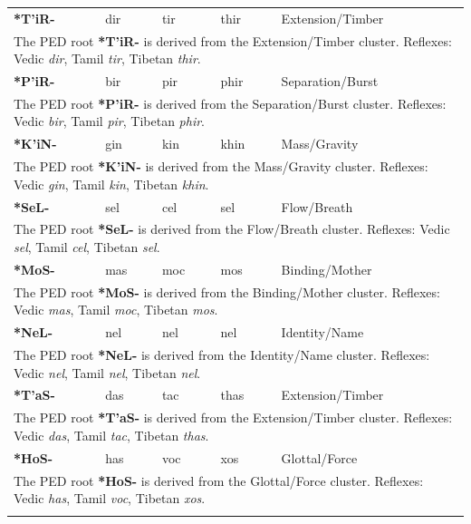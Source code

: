 \begin{longtable}{p{} p{} p{} p{} p{}}
\textbf{*T'iR-} & dir & tir & thir & Extension/Timber \\ 
\multicolumn{5}{p{\textwidth}}{\small The PED root \textbf{*T'iR-} is derived from the Extension/Timber cluster. Reflexes: Vedic \textit{dir}, Tamil \textit{tir}, Tibetan \textit{thir}. } \\ \addlinespace 
\textbf{*P'iR-} & bir & pir & phir & Separation/Burst \\ 
\multicolumn{5}{p{\textwidth}}{\small The PED root \textbf{*P'iR-} is derived from the Separation/Burst cluster. Reflexes: Vedic \textit{bir}, Tamil \textit{pir}, Tibetan \textit{phir}. } \\ \addlinespace 
\textbf{*K'iN-} & gin & kin & khin & Mass/Gravity \\ 
\multicolumn{5}{p{\textwidth}}{\small The PED root \textbf{*K'iN-} is derived from the Mass/Gravity cluster. Reflexes: Vedic \textit{gin}, Tamil \textit{kin}, Tibetan \textit{khin}. } \\ \addlinespace 
\textbf{*SeL-} & sel & cel & sel & Flow/Breath \\ 
\multicolumn{5}{p{\textwidth}}{\small The PED root \textbf{*SeL-} is derived from the Flow/Breath cluster. Reflexes: Vedic \textit{sel}, Tamil \textit{cel}, Tibetan \textit{sel}. } \\ \addlinespace 
\textbf{*MoS-} & mas & moc & mos & Binding/Mother \\ 
\multicolumn{5}{p{\textwidth}}{\small The PED root \textbf{*MoS-} is derived from the Binding/Mother cluster. Reflexes: Vedic \textit{mas}, Tamil \textit{moc}, Tibetan \textit{mos}. } \\ \addlinespace 
\textbf{*NeL-} & nel & nel & nel & Identity/Name \\ 
\multicolumn{5}{p{\textwidth}}{\small The PED root \textbf{*NeL-} is derived from the Identity/Name cluster. Reflexes: Vedic \textit{nel}, Tamil \textit{nel}, Tibetan \textit{nel}. } \\ \addlinespace 
\textbf{*T'aS-} & das & tac & thas & Extension/Timber \\ 
\multicolumn{5}{p{\textwidth}}{\small The PED root \textbf{*T'aS-} is derived from the Extension/Timber cluster. Reflexes: Vedic \textit{das}, Tamil \textit{tac}, Tibetan \textit{thas}. } \\ \addlinespace 
\textbf{*HoS-} & has & voc & xos & Glottal/Force \\ 
\multicolumn{5}{p{\textwidth}}{\small The PED root \textbf{*HoS-} is derived from the Glottal/Force cluster. Reflexes: Vedic \textit{has}, Tamil \textit{voc}, Tibetan \textit{xos}. } \\ \addlinespace 

\end{longtable}
